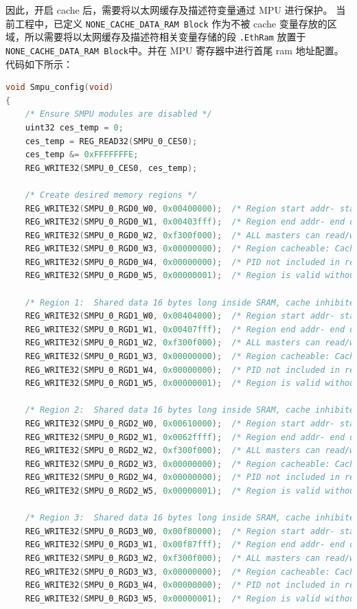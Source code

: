 因此，开启 cache 后，需要将以太网缓存及描述符变量通过 MPU 进行保护。
当前工程中，已定义 \lstinline{NONE_CACHE_DATA_RAM Block} 作为不被 cache 变量存放的区域，所以需要将以太网缓存及描述符相关变量存储的段
\lstinline{.EthRam} 放置于 \lstinline{NONE_CACHE_DATA_RAM Block}中。并在 MPU 寄存器中进行首尾 ram 地址配置。代码如下所示：


\begin{lstlisting}[language=C,style=C]
void Smpu_config(void) 
{
    /* Ensure SMPU modules are disabled */
    uint32 ces_temp = 0;
    ces_temp = REG_READ32(SMPU_0_CES0);
    ces_temp &= 0xFFFFFFFE;
    REG_WRITE32(SMPU_0_CES0, ces_temp);

    /* Create desired memory regions */
    REG_WRITE32(SMPU_0_RGD0_W0, 0x00400000);  /* Region start addr- start of SRAM */
    REG_WRITE32(SMPU_0_RGD0_W1, 0x00403fff);  /* Region end addr- end of SRAM  */
    REG_WRITE32(SMPU_0_RGD0_W2, 0xf300f000);  /* ALL masters can read/write */
    REG_WRITE32(SMPU_0_RGD0_W3, 0x00000000);  /* Region cacheable: Cache Inhibit=0*/
    REG_WRITE32(SMPU_0_RGD0_W4, 0x00000000);  /* PID not included in region eval. */
    REG_WRITE32(SMPU_0_RGD0_W5, 0x00000001);  /* Region is valid without lock */

    /* Region 1:  Shared data 16 bytes long inside SRAM, cache inhibited */
    REG_WRITE32(SMPU_0_RGD1_W0, 0x00404000);  /* Region start addr- start of SRAM */
    REG_WRITE32(SMPU_0_RGD1_W1, 0x00407fff);  /* Region end addr- end of SRAM  */
    REG_WRITE32(SMPU_0_RGD1_W2, 0xf300f000);  /* ALL masters can read/write */
    REG_WRITE32(SMPU_0_RGD1_W3, 0x00000000);  /* Region cacheable: Cache Inhibit=0*/
    REG_WRITE32(SMPU_0_RGD1_W4, 0x00000000);  /* PID not included in region eval. */
    REG_WRITE32(SMPU_0_RGD1_W5, 0x00000001);  /* Region is valid without lock */

    /* Region 2:  Shared data 16 bytes long inside SRAM, cache inhibited */
    REG_WRITE32(SMPU_0_RGD2_W0, 0x00610000);  /* Region start addr- start of SRAM */
    REG_WRITE32(SMPU_0_RGD2_W1, 0x0062ffff);  /* Region end addr- end of SRAM  */
    REG_WRITE32(SMPU_0_RGD2_W2, 0xf300f000);  /* ALL masters can read/write */
    REG_WRITE32(SMPU_0_RGD2_W3, 0x00000000);  /* Region cacheable: Cache Inhibit=0*/
    REG_WRITE32(SMPU_0_RGD2_W4, 0x00000000);  /* PID not included in region eval. */
    REG_WRITE32(SMPU_0_RGD2_W5, 0x00000001);  /* Region is valid without lock */

    /* Region 3:  Shared data 16 bytes long inside SRAM, cache inhibited */
    REG_WRITE32(SMPU_0_RGD3_W0, 0x00f80000);  /* Region start addr- start of SRAM */
    REG_WRITE32(SMPU_0_RGD3_W1, 0x00f87fff);  /* Region end addr- end of SRAM  */
    REG_WRITE32(SMPU_0_RGD3_W2, 0xf300f000);  /* ALL masters can read/write */
    REG_WRITE32(SMPU_0_RGD3_W3, 0x00000000);  /* Region cacheable: Cache Inhibit=0*/
    REG_WRITE32(SMPU_0_RGD3_W4, 0x00000000);  /* PID not included in region eval. */
    REG_WRITE32(SMPU_0_RGD3_W5, 0x00000001);  /* Region is valid without lock */


\end{lstlisting}
